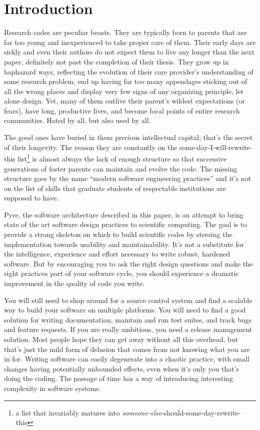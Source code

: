 %
%

\section{Introduction}
\label{sec:introduction}

Research codes are peculiar beasts. They are typically born to parents that are far too
young and inexperienced to take proper care of them. Their early days are sickly and even
their authors do not expect them to live any longer than the next paper, definitely not
past the completion of their thesis. They grow up in haphazard ways, reflecting the
evolution of their care provider's understanding of some research problem, end up having
far too many appendages sticking out of all the wrong places and display very few signs of
any organizing principle, let alone design.  Yet, many of them outlive their parent's
wildest expectations (or fears), have long, productive lives, and become focal points of
entire research communities. Hated by all, but also used by all.

The good ones have buried in them precious intellectual capital; that's the secret of their
longevity. The reason they are constantly on the some-day-I-will-rewrite-this list\footnote{a
  list that invariably matures into {\em someone-else}-should-some-day-rewrite-this} is almost
always the lack of enough structure so that successive generations of foster parents can
maintain and evolve the code. The missing structure goes by the name ``modern software
engineering practices'' and it's not on the list of skills that graduate students of
respectable institutions are supposed to have.

Pyre, the software architecture described in this paper, is an attempt to bring state of the
art software design practices to scientific computing. The goal is to provide a strong
skeleton on which to build scientific codes by steering the implementation towards usability
and maintainability. It's not a substitute for the intelligence, experience and effort
necessary to write robust, hardened software. But by encouraging you to ask the right design
questions and make the right practices part of your software cycle, you should experience a
dramatic improvement in the quality of code you write.

You will still need to shop around for a source control system and find a scalable way to build
your software on multiple platforms. You will need to find a good solution for writing
documentation, maintain and run test suites, and track bugs and feature requests. If you are
really ambitious, you need a release management solution. Most people hope they can get away
without all this overhead, but that's just the mild form of delusion that comes from not
knowing what you are in for.  Writing software can easily degenerate into a chaotic practice,
with small changes having potentially unbounded effects, even when it's only you that's doing
the coding. The passage of time has a way of introducing interesting complexity in software
systems.

